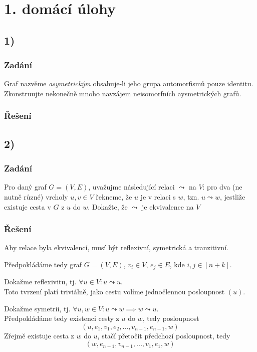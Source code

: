 \documentclass[../main.tex]{subfiles}
\begin{document}
\section*{1. domácí úlohy}

\subsection*{1)}
\subsubsection*{Zadání}
Graf nazvěme \textit{asymetrickým} obsahuje-li jeho grupa automorfismů pouze identitu.
Zkonstruujte nekonečně mnoho navzájem neisomorfních aysmetrických grafů.
\subsubsection*{Řešení}


\subsection*{2)}
\subsubsection*{Zadání}
Pro daný graf $G=(V,E)$, uvažujme následující relaci $\leadsto$ na $V$: pro dva (ne nutně různé) vrcholy $u,v\in V$ řekneme, že 
$u$ je v relaci s $w$, tzn. $u\leadsto w$, jestliže existuje cesta v $G$ z $u$ do $w$. Dokažte, že $\leadsto$ je ekvivalence na $V$
\subsubsection*{Řešení}
Aby relace byla ekvivalencí, musí být reflexivní, symetrická a tranzitivní.

Předpokládáme tedy graf $G=(V,E)$, $v_i\in V$, $e_j\in E$, kde $i,j \in [n+k]$.

Dokažme reflexivitu, tj. $\forall u\in V: u\leadsto u$.\\
Toto tvrzení platí triviálně, jako cestu volíme jednočlennou posloupnost $(u)$.

Dokažme symetrii, tj. $\forall u,w\in V: u\leadsto w \implies w\leadsto u$.\\
Předpokládáme tedy existenci cesty z $u$ do $w$, tedy posloupnost 
\begin{equation*}
    (u, e_1, v_1, e_2, ..., v_{n-1}, e_{n-1}, w)
\end{equation*}
Zřejmě existuje cesta z $w$ do $u$, stačí přetočit předchozí posloupnost, tedy
\begin{equation*}
    (w, e_{n-1}, v_{n-1}, ..., v_1, e_1, w)
\end{equation*}
\end{document}
